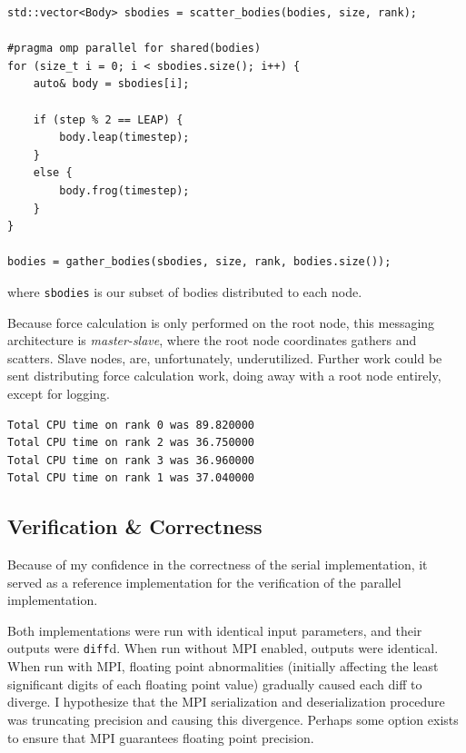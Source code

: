 \documentclass[11pt,a4paper]{article}
\begin{document}
\begin{verbatim}
std::vector<Body> sbodies = scatter_bodies(bodies, size, rank);

#pragma omp parallel for shared(bodies)
for (size_t i = 0; i < sbodies.size(); i++) {
    auto& body = sbodies[i];

    if (step % 2 == LEAP) {
        body.leap(timestep);
    }
    else {
        body.frog(timestep);
    }
}

bodies = gather_bodies(sbodies, size, rank, bodies.size());
\end{verbatim}

where \texttt{sbodies} is our subset of bodies distributed to each node. 

Because force calculation is only performed on the root node, this messaging architecture is \textit{master-slave}, where the root node coordinates gathers and scatters. Slave nodes, are, unfortunately, underutilized. Further work could be sent distributing force calculation work, doing away with a root node entirely, except for logging.

\begin{verbatim}
Total CPU time on rank 0 was 89.820000
Total CPU time on rank 2 was 36.750000
Total CPU time on rank 3 was 36.960000
Total CPU time on rank 1 was 37.040000
\end{verbatim}


\subsection*{Verification \& Correctness}

Because of my confidence in the correctness of the serial implementation, it served as a reference implementation for the verification of the parallel implementation.

Both implementations were run with identical input parameters, and their outputs were \texttt{diff}d. When run without MPI enabled, outputs were identical. When run with MPI, floating point abnormalities (initially affecting the least significant digits of each floating point value) gradually caused each diff to diverge. I hypothesize that the MPI serialization and deserialization procedure was truncating precision and causing this divergence. Perhaps some option exists to ensure that MPI guarantees floating point precision.


\end{document}
